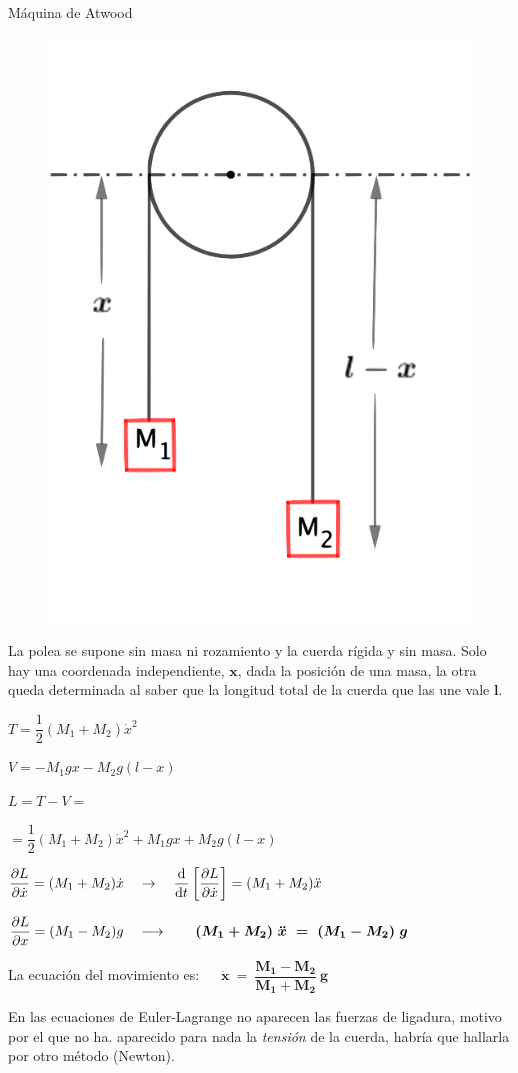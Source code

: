 	


\vspace{0.3cm}
\begin{myexampleblock}{Máquina de Atwood}
	\begin{multicols}{2}
		\begin{figure}[H]
		\centering
		\includegraphics[width=.35\textwidth]{imagenes/img03-05.png}
		\end{figure}
	La polea se supone sin masa ni rozamiento y la cuerda rígida y sin masa. Solo hay una coordenada independiente, $\boldsymbol x$, dada la posición de una masa, la otra queda determinada al saber que la longitud total de la cuerda que las une vale $\boldsymbol l$.
	
	\vspace{5mm} $T=\dfrac 1 2 (M_1+M_2) \dot x ^2$
	
	\vspace{2mm} $V=-M_1gx - M_2g(l-x)$
	
	
	\vspace{5mm} $L=T-V= $
	
	$=\dfrac 1 2 (M_1+M_2)\dot x^2 +M_1gx +M_2g(l-x)$
	\end{multicols}

\vspace{3mm} $\displaystyle \pdv{L}{\dot x}=(M_1+M_2) \dot x \quad \to \quad \dv{t} \left[ \pdv{L}{\dot x} \right]=(M_1+M_2) \ddot x$

\vspace{3mm} $\displaystyle \pdv{L}{x}=(M_1-M_2)g \quad \longrightarrow \qquad \boldsymbol{(M_1+M_2) \ \ddot x\ = \ (M_1-M_2) \ g}$

\vspace{5mm} La ecuación del movimiento es: $ \quad \boldsymbol{ 
\boxed{ 
\ \ddot x \ = \ \dfrac{M_1-M_2}{M_1+M_2}\ g 
\ }
}$

\vspace{5mm} En las ecuaciones de Euler-Lagrange no aparecen las fuerzas de ligadura, motivo por el que no ha. aparecido para nada la \emph{tensión} de la cuerda, habría que hallarla por otro método (Newton).
\end{myexampleblock}


